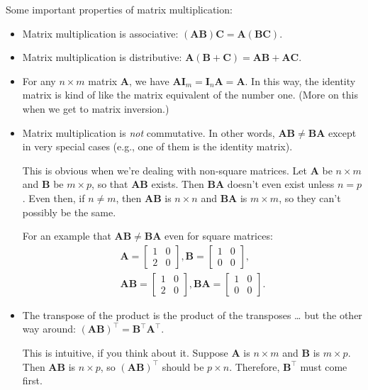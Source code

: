 \documentclass[
  12pt,
  oneside,openany]{book}
\begin{document}
Some important properties of matrix multiplication:

\begin{itemize}
\item
  Matrix multiplication is associative: \((\mathbf{A} \mathbf{B}) \mathbf{C} = \mathbf{A} (\mathbf{B} \mathbf{C})\).
\item
  Matrix multiplication is distributive: \(\mathbf{A} (\mathbf{B} + \mathbf{C}) = \mathbf{A} \mathbf{B} + \mathbf{A} \mathbf{C}\).
\item
  For any \(n \times m\) matrix \(\mathbf{A}\), we have \(\mathbf{A} \mathbf{I}_m = \mathbf{I}_n \mathbf{A} = \mathbf{A}\). In this way, the identity matrix is kind of like the matrix equivalent of the number one. (More on this when we get to matrix inversion.)
\item
  Matrix multiplication is \emph{not} commutative. In other words, \(\mathbf{A} \mathbf{B} \neq \mathbf{B} \mathbf{A}\) except in very special cases (e.g., one of them is the identity matrix).

  This is obvious when we're dealing with non-square matrices. Let \(\mathbf{A}\) be \(n \times m\) and \(\mathbf{B}\) be \(m \times p\), so that \(\mathbf{A} \mathbf{B}\) exists. Then \(\mathbf{B} \mathbf{A}\) doesn't even exist unless \(n = p\). Even then, if \(n \neq m\), then \(\mathbf{A} \mathbf{B}\) is \(n \times n\) and \(\mathbf{B} \mathbf{A}\) is \(m \times m\), so they can't possibly be the same.

  For an example that \(\mathbf{A} \mathbf{B} \neq \mathbf{B} \mathbf{A}\) even for square matrices: \[\begin{gathered}
  \mathbf{A} = \begin{bmatrix}
    1 & 0 \\
    2 & 0
  \end{bmatrix},
  \mathbf{B} = \begin{bmatrix}
    1 & 0 \\
    0 & 0
  \end{bmatrix}, \\
  \mathbf{A} \mathbf{B} = \begin{bmatrix}
    1 & 0 \\
    2 & 0
  \end{bmatrix},
  \mathbf{B} \mathbf{A} = \begin{bmatrix}
    1 & 0 \\
    0 & 0
  \end{bmatrix}.
  \end{gathered}
  \]
\item
  The transpose of the product is the product of the transposes \ldots{} but the other way around: \((\mathbf{A} \mathbf{B})^\top = \mathbf{B}^\top \mathbf{A}^\top\).

  This is intuitive, if you think about it. Suppose \(\mathbf{A}\) is \(n \times m\) and \(\mathbf{B}\) is \(m \times p\). Then \(\mathbf{A} \mathbf{B}\) is \(n \times p\), so \((\mathbf{A} \mathbf{B})^\top\) should be \(p \times n\). Therefore, \(\mathbf{B}^\top\) must come first.
\end{itemize}
\end{document}

